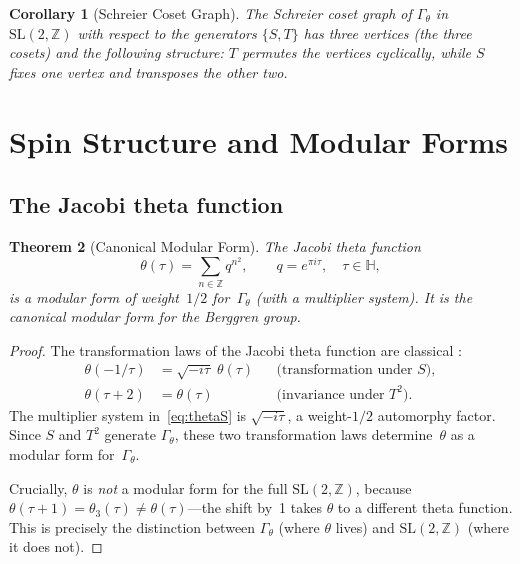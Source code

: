 \documentclass[12pt]{amsart}
\newtheorem{theorem}{Theorem}[section]
\newtheorem{corollary}[theorem]{Corollary}
\theoremstyle{definition}
\theoremstyle{remark}
\newcommand{\SL}{\mathrm{SL}}
\newcommand{\Z}{\mathbb{Z}}
\newcommand{\HH}{\mathbb{H}}
\newcommand{\Gtheta}{\Gamma_\theta}
\begin{document}
\begin{corollary}[Schreier Coset Graph]\label{cor:schreier}
The Schreier coset graph of $\Gtheta$ in $\SL(2,\Z)$ with respect to
the generators $\{S, T\}$ has three vertices (the three cosets) and the
following structure: $T$ permutes the vertices cyclically, while $S$
fixes one vertex and transposes the other two.
\end{corollary}


\section{Spin Structure and Modular Forms}\label{sec:spin}

\subsection{The Jacobi theta function}

\begin{theorem}[Canonical Modular Form]\label{thm:thetafn}
The Jacobi theta function
\begin{equation}\label{eq:theta}
\theta(\tau) = \sum_{n \in \Z} q^{n^2}, \qquad q = e^{\pi i \tau},
\quad \tau \in \HH,
\end{equation}
is a modular form of weight~$1/2$ for~$\Gtheta$ (with a multiplier
system).  It is the canonical modular form for the Berggren group.
\end{theorem}

\begin{proof}
The transformation laws of the Jacobi theta function are classical
\cite{mumford-tata}:
\begin{align}
\theta(-1/\tau) &= \sqrt{-i\tau}\;\theta(\tau) &
&\text{(transformation under } S\text{)}, \label{eq:thetaS}\\
\theta(\tau+2) &= \theta(\tau) &
&\text{(invariance under } T^2\text{)}. \label{eq:thetaT2}
\end{align}
The multiplier system in~\eqref{eq:thetaS} is $\sqrt{-i\tau}$, a
weight-$1/2$ automorphy factor.  Since $S$ and $T^2$ generate $\Gtheta$,
these two transformation laws determine~$\theta$ as a modular form
for~$\Gtheta$.

Crucially, $\theta$ is \emph{not} a modular form for the full
$\SL(2,\Z)$, because $\theta(\tau+1) = \theta_3(\tau) \ne
\theta(\tau)$---the shift by~1 takes $\theta$ to a different theta
function.  This is precisely the distinction between $\Gtheta$ (where
$\theta$ lives) and $\SL(2,\Z)$ (where it does not).
\end{proof}
\end{document}

